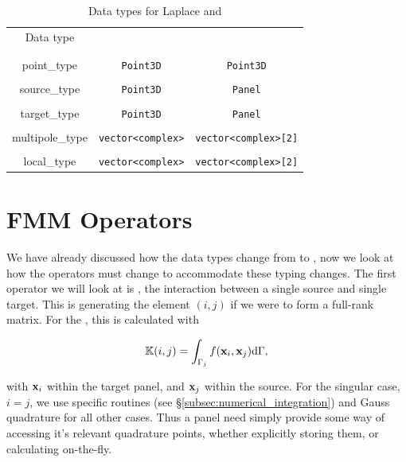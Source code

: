 \begin{table}[htdp]
\begin{center}
\begin{tabular}{c|c|c}
	Data type & {\fmm} & {\fmmbem} \\
	& & \\ \hline
	& & \\
	point\_type & {\lstinline|Point3D|} & {\lstinline|Point3D|} \\ 
	& & \\
	source\_type & {\lstinline|Point3D|} & {\lstinline|Panel|} \\
	& & \\
	target\_type & {\lstinline|Point3D|} & {\lstinline|Panel|} \\
	& & \\
	multipole\_type & {\lstinline|vector<complex>|} & {\lstinline|vector<complex>[2]|} \\
	& & \\
	local\_type & {\lstinline|vector<complex>|} & {\lstinline|vector<complex>[2]|}
\end{tabular}
\end{center}
\caption{Data types for Laplace {\fmm} and {\fmmbem}}
\label{tab:fmm_data_types}
\end{table}%

\section{FMM Operators}\label{sec:fmm_operators}

We have already discussed how the data types change from {\fmm} to {\fmmbem}, now we look at how the {\fmm} operators must change to accommodate these typing changes. The first operator we will look at is {\ptop}, the interaction between a single source and single target. This is generating the element $(i,j)$ if we were to form a full-rank matrix. For the {\bem}, this is calculated with

\begin{equation}
	\mathbb{K}(i,j) = \int_{\Gamma_j} f(\mathbf{x}_i, \mathbf{x}_j) \text{d}\Gamma,
\end{equation}

with $\mathbf{x}_i$ within the target panel, and $\mathbf{x}_j$ within the source. For the singular case, $i=j$, we use specific routines (see \S\ref{subsec:numerical_integration}) and Gauss quadrature for all other cases. Thus a panel need simply provide some way of accessing it's relevant quadrature points, whether explicitly storing them, or calculating on-the-fly.

